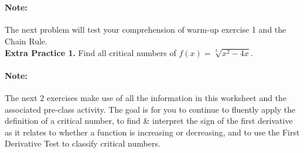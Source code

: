 \documentclass[10pt]{article}
\begin{document}
%
\begin{minipage}{0.45\textwidth}
\begin{center}
\end{center}
\end{minipage}\\


\vfill


\paragraph*{Note:} The next problem will test your comprehension of warm-up exercise 1 and the Chain Rule.\\

{\bf\color{blue} Extra Practice 1.} \reversemarginpar{} Find all critical numbers of $f(x)=\sqrt[3]{x^2-4x}$.

\vfill



\newpage

\paragraph*{Note:} The next 2 exercises make use of all the information in this worksheet and the associated pre-class activity. The goal is for you to continue to fluently apply the definition of a critical number, to find \& interpret the sign of the first derivative as it relates to whether a function is increasing or decreasing, and to use the First Derivative Test to classify critical numbers.\\
\end{document}
